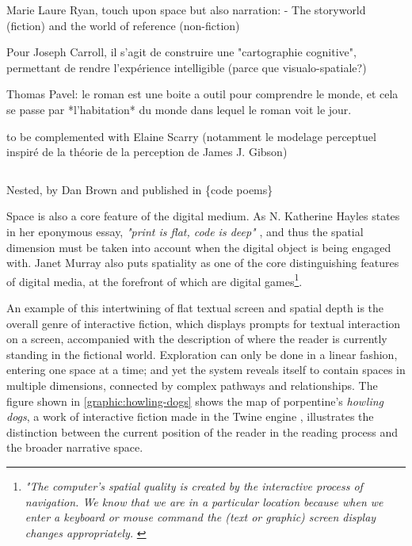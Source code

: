 Marie Laure Ryan, touch upon space but also narration:
- The storyworld (fiction) and the world of reference (non-fiction)


Pour Joseph Carroll, il s'agit de construire une "cartographie cognitive", permettant de rendre l'expérience intelligible (parce que visualo-spatiale?)

Thomas Pavel: le roman est une boite a outil pour comprendre le monde, et cela se passe par *l'habitation* du monde dans lequel le roman voit le jour.

to be complemented with Elaine Scarry (notamment le modelage perceptuel inspiré de la théorie de la perception de James J. Gibson)

\begin{listing}
    \inputminted[]{html}{./corpus/nested.html}
    \caption{Nested, by Dan Brown and published in \{code poems\} \citep{bertram_code_2012}}
    \label{code:nested}
\end{listing}

Space is also a core feature of the digital medium. As N. Katherine Hayles states in her eponymous essay, \emph{"print is flat, code is deep"} \citep{hayles_print_2004}, and thus the spatial dimension must be taken into account when the digital object is being engaged with. Janet Murray also puts spatiality as one of the core distinguishing features of digital media, at the forefront of which are digital games\footnote{\emph{"The computer's spatial quality is created by the interactive process of navigation. We know that we are in a particular location because when we enter a keyboard or mouse command the (text or graphic) screen display changes appropriately.} \citep{murray_hamlet_1998}}.

An example of this intertwining of flat textual screen and spatial depth is the overall genre of interactive fiction, which displays prompts for textual interaction on a screen, accompanied with the description of where the reader is currently standing in the fictional world. Exploration can only be done in a linear fashion, entering one space at a time; and yet the system reveals itself to contain spaces in multiple dimensions, connected by complex pathways and relationships. The figure shown in \ref{graphic:howling-dogs} shows the map of porpentine's \emph{howling dogs}, a work of interactive fiction made in the Twine engine \citep{porpentine_howling_2012}, illustrates the distinction between the current position of the reader in the reading process and the broader narrative space.


